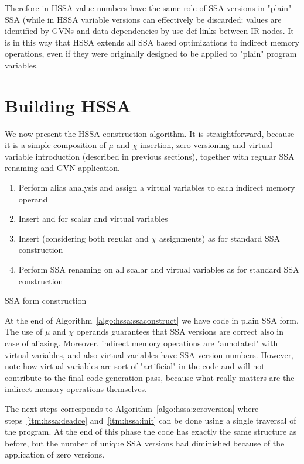 Therefore in HSSA value numbers have the same role of SSA versions in "plain" SSA (while in HSSA variable versions can effectively be discarded: values are identified by GVNs and data dependencies by use-def links between IR nodes.
It is in this way that HSSA extends all SSA based optimizations to indirect memory operations, even if they were originally designed to be applied to "plain" program variables.


\section{Building HSSA}
We now present the HSSA construction algorithm.
It is straightforward, because it is a simple composition of $\mu$ and $\chi$ insertion, zero versioning and virtual variable introduction (described in previous sections), together with regular SSA renaming and GVN application.

\begin{algorithm}[H]
\LinesNumbered
\begin{enumerate}
\item Perform alias analysis and assign a virtual variables to each indirect memory operand
\item Insert \mufuns and \chifuns for scalar and virtual variables
\item Insert \phifuns (considering both regular and $\chi$ assignments) as for standard SSA construction
\item Perform SSA renaming on all scalar and virtual variables as for standard SSA construction 
\end{enumerate}
\caption{\label{algo:hssa:ssaconstruct}SSA form construction}
\end{algorithm}

At the end of Algorithm~\ref{algo:hssa:ssaconstruct} we have code in plain SSA form.
The use of $\mu$ and $\chi$ operands guarantees that SSA versions are correct also in case of aliasing.
Moreover, indirect memory operations are "annotated" with virtual variables, and also virtual variables have SSA version numbers.
However, note how virtual variables are sort of "artificial" in the code and will not contribute to the final code generation pass, because what really matters are the indirect memory operations themselves.

The next steps corresponds to Algorithm~\ref{algo:hssa:zeroversion} where steps~\ref{itm:hssa:deadce} and~\ref{itm:hssa:init} can be done using a single traversal of the program. 
At the end of this phase the code has exactly the same structure as before, but the number of unique SSA versions had diminished because of the application of zero versions.

